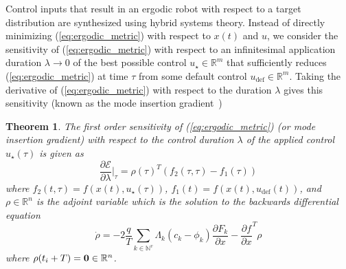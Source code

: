 \documentclass[conference]{IEEEtran}
\newtheorem{theorem}{Theorem}
\begin{document}
Control inputs that result in an ergodic robot with respect to a target distribution are synthesized using hybrid systems theory.
Instead of directly minimizing (\ref{eq:ergodic_metric}) with respect to $x(t)$ and $u$, we consider the sensitivity of (\ref{eq:ergodic_metric}) with respect to an infinitesimal application duration $\lambda \to 0$ of the best possible control $u_\star \in \mathbb{R}^m$ that sufficiently reduces (\ref{eq:ergodic_metric}) at time $\tau$ from some default control $u_\text{def} \in \mathbb{R}^m$.
Taking the derivative of (\ref{eq:ergodic_metric}) with respect to the duration $\lambda$ gives this sensitivity (known as the mode insertion gradient~\cite{vasudevan2013consistent, axelsson2008gradient, egerstedt2006transition,caldwell2016projection})
\begin{theorem}
The first order sensitivity of (\ref{eq:ergodic_metric}) (or mode insertion gradient) with respect to the control duration $\lambda$ of the applied control $u_\star(\tau)$ is given as
\begin{equation}
\frac{\partial \mathcal{E}}{\partial \lambda} \Big \vert_\tau = \rho(\tau)^T (f_2(\tau, \tau) - f_1(\tau))
\end{equation}
where $f_2(t, \tau) = f(x(t), u_\star(\tau))$, $f_1(t) = f(x(t), u_\text{def}(t))$, and $\rho \in \mathbb{R}^n$ is the adjoint variable which is the solution to the backwards differential equation
\begin{equation}
\dot{\rho} = - 2 \frac{q}{T} \sum_{k \in \mathbb{N}^v} \Lambda_k (c_k - \phi_k) \frac{\partial F_k}{\partial x} - \frac{\partial f}{\partial x}^T \rho
\end{equation}
where $\rho(t_i + T) = \bold{0} \in \mathbb{R}^n$.
\end{theorem}
\end{document}
